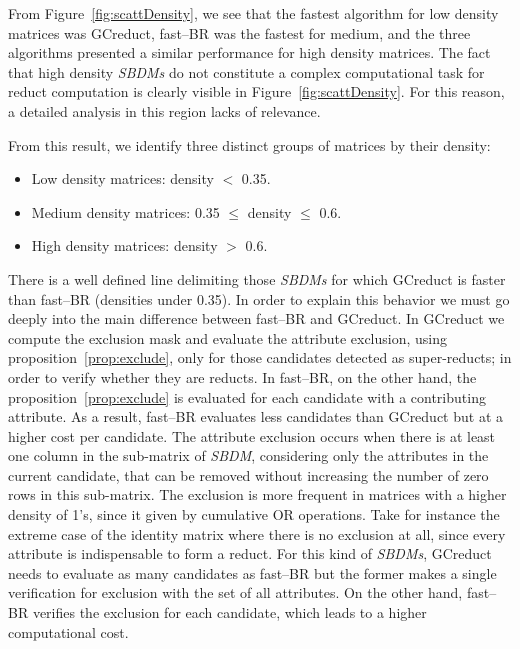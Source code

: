 \documentclass[authoryear,preprint,review,12pt]{elsarticle}
\begin{document}
	From Figure~\ref{fig:scattDensity}, we see that the fastest algorithm for low density matrices was GCreduct, fast--BR was the fastest for medium, and the three algorithms presented a similar performance for high density matrices. The fact that high density \textit{SBDMs} do not constitute a complex computational task for reduct computation \citep{Rojas12} is clearly visible in Figure~\ref{fig:scattDensity}. For this reason, a detailed analysis in this region lacks of relevance.
	
	From this result, we identify three distinct groups of matrices by their density:
	\begin{itemize}
		\item Low density matrices: density $<$ 0.35.
		\item Medium density matrices: 0.35 $\leq$ density $\leq$ 0.6.
		\item High density matrices: density $>$ 0.6.
	\end{itemize}
	
		
	There is a well defined line delimiting those \textit{SBDMs} for which GCreduct is faster than fast--BR (densities under 0.35). In order to explain this behavior we must go deeply into the main difference between fast--BR and GCreduct. In GCreduct we compute the exclusion mask and evaluate the attribute exclusion, using proposition~\ref{prop:exclude}, only for those candidates detected as super-reducts; in order to verify whether they are reducts. In fast--BR, on the other hand, the proposition~\ref{prop:exclude} is evaluated for each candidate with a contributing attribute. As a result, fast--BR evaluates less candidates than GCreduct but at a higher cost per candidate. The attribute exclusion occurs when there is at least one column in the sub-matrix of \textit{SBDM}, considering only the attributes in the current candidate, that can be removed without increasing the number of zero rows in this sub-matrix. The exclusion is more frequent in matrices with a higher density of 1's, since it given by cumulative OR operations. Take for instance the extreme case of the identity matrix where there is no exclusion at all, since every attribute is indispensable to form a reduct. For this kind of \textit{SBDMs}, GCreduct needs to evaluate as many candidates as fast--BR but the former makes a single verification for exclusion with the set of all attributes. On the other hand, fast--BR verifies the exclusion for each candidate, which leads to a higher computational cost.
	
\end{document}
